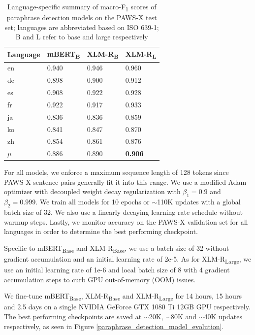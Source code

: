 \documentclass[11pt,a4paper]{article}
\begin{document}
\begin{table}
  \centering
  \begin{tabular}{llll}
    \hline
    \textbf{Language} & \textbf{mBERT\textsubscript{B}} & \textbf{XLM-R\textsubscript{B}} & \textbf{XLM-R\textsubscript{L}} \\
    \hline
    en & 0.940 & 0.946 & 0.960 \\
    de & 0.898 & 0.900 & 0.912 \\
    es & 0.908 & 0.922 & 0.928 \\
    fr & 0.922 & 0.917 & 0.933 \\
    ja & 0.836 & 0.836 & 0.859 \\
    ko & 0.841 & 0.847 & 0.870 \\
    zh & 0.854 & 0.861 & 0.876 \\
    \hline \hline
    $\mu$ & 0.886 & 0.890 & \textbf{0.906} \\
    \hline
  \end{tabular} 
  \caption{Language-specific summary of macro-F\textsubscript{1} scores of paraphrase detection models on the PAWS-X test set; languages are abbreviated based on ISO 639-1; B and L refer to base and large respectively}
  \label{pawsx_score_breakdown}
\end{table}

For all models, we enforce a maximum sequence length of 128 tokens since PAWS-X sentence pairs generally fit it into this range. We use a modified Adam optimizer with decoupled weight decay regularization \cite{DBLP:journals/corr/abs-1711-05101} with $\beta_1 = 0.9$ and $\beta_2=0.999$. We train all models for 10 epochs or $\sim$110K updates with a global batch size of 32. We also use a linearly decaying learning rate schedule without warmup steps. Lastly, we monitor accuracy on the PAWS-X validation set for all languages in order to determine the best performing checkpoint.

Specific to mBERT\textsubscript{Base} and XLM-R\textsubscript{Base}, we use a batch size of 32 without gradient accumulation and an initial learning rate of 2e-5. As for XLM-R\textsubscript{Large}, we use an initial learning rate of 1e-6 and local batch size of 8 with 4 gradient accumulation steps to curb GPU out-of-memory (OOM) issues.

We fine-tune mBERT\textsubscript{Base}, XLM-R\textsubscript{Base} and XLM-R\textsubscript{Large} for 14 hours, 15 hours and 2.5 days on a single NVIDIA GeForce GTX 1080 Ti 12GB GPU respectively. The best performing checkpoints are saved at $\sim$20K, $\sim$80K and $\sim$40K updates respectively, as seen in Figure \ref{paraphrase_detection_model_evolution}.
\end{document}
